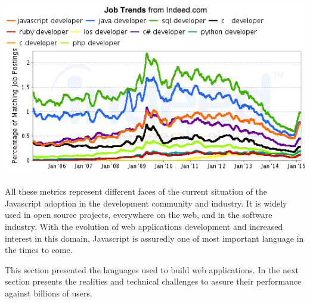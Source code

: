 \includegraphics[width=0.9\linewidth]{../../data/js-trends/jobgraph}

\paragraph{}

All these metrics represent different faces of the current situation of the Javascript adoption in the development community and industry.
It is widely used in open source projects, everywhere on the web, and in the software industry.
With the evolution of web applications development and increased interest in this domain, Javascript is assuredly one of most important language in the times to come.

This section presented the languages used to build web applications.
In the next section presents the realities and technical challenges to assure their performance against billions of users.